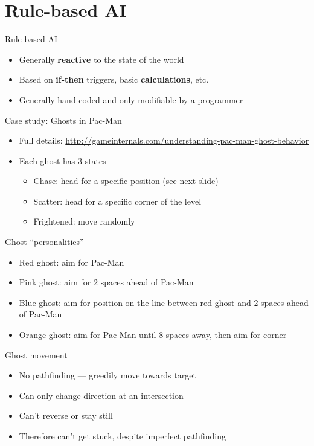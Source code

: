 \part{Rule-based AI}
\frame{\partpage}

\begin{frame}{Rule-based AI}
	\begin{itemize}
		\pause\item Generally \textbf{reactive} to the state of the world
		\pause\item Based on \textbf{if-then} triggers, basic \textbf{calculations}, etc.
		\pause\item Generally hand-coded and only modifiable by a programmer
	\end{itemize}
\end{frame}

\begin{frame}{Case study: Ghosts in Pac-Man}
	\begin{itemize}
		\pause\item Full details: \url{http://gameinternals.com/understanding-pac-man-ghost-behavior}
		\pause\item Each ghost has 3 states
			\begin{itemize}
				\pause\item Chase: head for a specific position (see next slide)
				\pause\item Scatter: head for a specific corner of the level
				\pause\item Frightened: move randomly
			\end{itemize}
	\end{itemize}
\end{frame}

\begin{frame}{Ghost ``personalities''}
	\begin{itemize}
		\pause\item Red ghost: aim for Pac-Man
		\pause\item Pink ghost: aim for 2 spaces ahead of Pac-Man
		\pause\item Blue ghost: aim for position on the line between red ghost and 2 spaces ahead of Pac-Man
		\pause\item Orange ghost: aim for Pac-Man until 8 spaces away, then aim for corner
	\end{itemize}
\end{frame}

\begin{frame}{Ghost movement}
	\begin{itemize}
		\pause\item No pathfinding --- greedily move towards target
		\pause\item Can only change direction at an intersection
		\pause\item Can't reverse or stay still
		\pause\item Therefore can't get stuck, despite imperfect pathfinding
	\end{itemize}
\end{frame}

